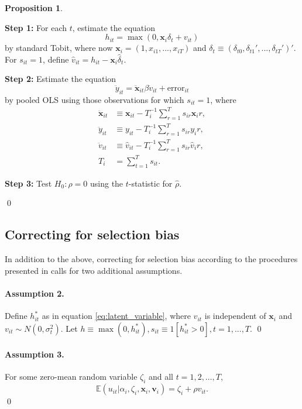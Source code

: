 \documentclass[a4paper,12pt]{article}
\theoremstyle{plain}
\theoremstyle{definition}
\theoremstyle{definition}
\theoremstyle{definition}
\newtheorem{proposition}[theorem]{Proposition}
\theoremstyle{definition}
\begin{document}
\begin{proposition} \citep[][Procedure 3.1]{wooldridge1995}
\label{prop:test}

\textbf{Step 1:} For each $t$, estimate the equation
\begin{equation}
    h_{it}=\max(0, \mathbf{x}_i\delta_t+v_{it})
\end{equation}
by standard Tobit, where now $\mathbf{x}_i =(1, x_{i1},...,x_{iT})$ and $\delta_t \equiv (\delta_{t0}, \delta_{t1}',...,\delta_{tT}')'$. For $s_{it}=1$, define $\hat{v}_{it} = h_{it}-\mathbf{x}_i\hat{\delta}_t$.

\textbf{Step 2:} Estimate the equation
\begin{equation}
    \ddot{y}_{it}=\ddot{\mathbf{x}}_{it} \beta \ddot{v}_{it}+ \text{error}_{it}
\end{equation}
by pooled OLS using those observations for which $s_{it}=1$, where
\begin{align}
    \ddot{\mathbf{x}}_{it}&\equiv\mathbf{x}_{it}-T_i^{-1}\sum_{r=1}^T s_{ir}\mathbf{x}_ir,\\
    \ddot{{y}}_{it}&\equiv y_{it}-T_i^{-1}\sum_{r=1}^T s_{ir} y_ir,\\
    \ddot{v}_{it}&\equiv \hat{v}_{it}-T_i^{-1}\sum_{r=1}^T s_{ir} \hat{v}_ir,\\
    T_i &= \sum_{t=1}^T s_{it}.
\end{align}

\textbf{Step 3:} Test $H_0: \rho=0$ using the $t$-statistic for $\hat{\rho}$.

\qed
\end{proposition}


\subsection{Correcting for selection bias}

In addition to the above, correcting for selection bias according to the procedures presented in \citet{wooldridge2010} calls for two additional assumptions.

\paragraph{Assumption 2.} \label{ass2} Define $h_{it}^*$ as in equation \ref{eq:latent_variable}, where $v_{it}$ is independent of $\mathbf{x}_i$ and $v_{it}\sim N(0,\sigma_t^2)$. Let $h\equiv \max(0,h_{it}^*), s_{it}\equiv 1[h_{it}^*>0], t=1,...,T.$ \qed

\paragraph{Assumption 3.} \label{ass3} For some zero-mean random variable $\zeta_i$ and all $t=1,2,\dots,T$,
\begin{equation}
    \mathbb{E}(u_{it}|\alpha_i,\zeta_i,\mathbf{x}_i,\mathbf{v}_i)= \zeta_i+\rho v_{it}.
\end{equation}
\qed
\end{document}
